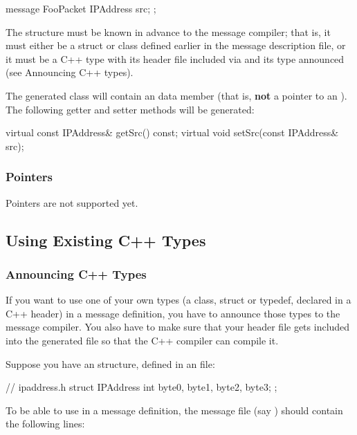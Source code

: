 \begin{msg}
message FooPacket
{
    IPAddress src;
};
\end{msg}

The  structure must be known in advance to the message compiler;
that is, it must either be a struct or class defined earlier in the message
description file, or it must be a C++ type with its header file
included via  and its type announced
(see Announcing C++ types).

The generated class will contain an  data member
(that is, \textbf{not} a pointer to an ).
The following getter and setter methods will be generated:

\begin{cpp}
virtual const IPAddress& getSrc() const;
virtual void setSrc(const IPAddress& src);
\end{cpp}


\subsubsection{Pointers}

Pointers are not supported yet.



\subsection{Using Existing C++ Types}


\subsubsection{Announcing C++ Types}

If you want to use one of your own types (a class, struct or typedef,
declared in a C++ header) in a message definition, you have to
announce those types to the message compiler. You also have to make sure
that your header file gets included into the generated  file
so that the C++ compiler can compile it.

Suppose you have an  structure, defined in an 
file:

\begin{cpp}
// ipaddress.h
struct IPAddress {
    int byte0, byte1, byte2, byte3;
};
\end{cpp}

To be able to use  in a message definition, the message
file (say ) should contain the following lines:

